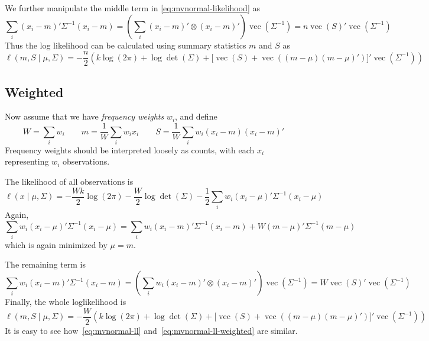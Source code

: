 \documentclass[b5paper,11pt]{article}
\DeclareMathOperator{\vect}{vec}
\begin{document}
We further manipulate the middle term in \eqref{eq:mvnormal-likelihood} as
\begin{equation}
  \sum_i (x_i-m)' \Sigma^{-1} (x_i-m) = \left(\sum_i (x_i-m)'\otimes(x_i-m)'\right) \vect(\Sigma^{-1}) =
  n \vect(S)'\vect(\Sigma^{-1})
\end{equation}
Thus the log likelihood can be calculated using summary statistics $m$ and $S$ as
\begin{equation}
  \label{eq:mvnormal-ll}
  \ell(m, S \mid \mu, \Sigma) = -\frac{n}{2}\left( k\log(2\pi) + \log\det(\Sigma) +
    \bigl[\vect(S) + \vect((m-\mu)(m-\mu)')\bigr]'\vect(\Sigma^{-1})\right)
\end{equation}

\subsection{Weighted}
\label{sec:weight-mult-norm}

Now assume that we have \emph{frequency weights} $w_i$, and define
\begin{equation}
  W = \sum_i w_i
  \qquad
  m = \frac1W \sum_i w_i x_i
  \qquad
  S = \frac1W \sum_i w_i (x_i - m) (x_i - m)'
\end{equation}
Frequency weights should be interpreted loosely as counts, with each $x_i$ representing $w_i$ observations.

The likelihood of all observations is
\begin{equation}
  \ell(x\mid\mu,\Sigma) = -\frac{Wk}{2}\log(2\pi) - \frac{W}{2}\log\det(\Sigma)
  - \frac12 \sum_i w_i (x_i - \mu)'\Sigma^{-1}(x_i-\mu)
\end{equation}
Again,
\begin{equation}
  \sum_i w_i (x_i - \mu)'\Sigma^{-1}(x_i-\mu) =
  \sum_i w_i (x_i - m)'\Sigma^{-1}(x_i-m) + W (m - \mu)'\Sigma^{-1}(m-\mu)
\end{equation}
which is again minimized by $\mu=m$.

The remaining term is
\begin{equation}
  \sum_i w_i (x_i - m)'\Sigma^{-1}(x_i-m) =
  \left( \sum_i w_i (x_i-m)'\otimes(x_i-m)'\right) \vect(\Sigma^{-1}) =
  W \vect(S)'\vect(\Sigma^{-1})
\end{equation}
Finally, the whole loglikelihood is
\begin{equation}
  \label{eq:mvnormal-ll-weighted}
  \ell(m, S \mid \mu, \Sigma) = -\frac{W}{2}\left( k\log(2\pi) + \log\det(\Sigma) +
    \bigl[\vect(S) + \vect((m-\mu)(m-\mu)')\bigr]'\vect(\Sigma^{-1})\right)
\end{equation}
It is easy to see how~\eqref{eq:mvnormal-ll} and~\eqref{eq:mvnormal-ll-weighted} are similar.

\printbibliography
\end{document}
